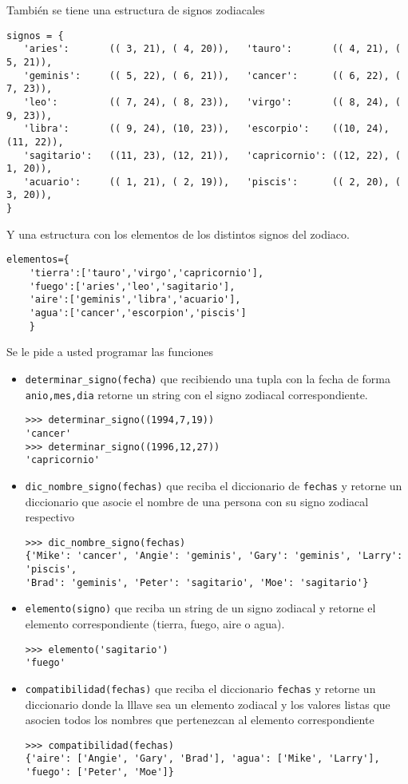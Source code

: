 También se tiene una estructura de signos zodiacales

\begin{lstlisting}[style=consola]
signos = {
   'aries':       (( 3, 21), ( 4, 20)),   'tauro':       (( 4, 21), ( 5, 21)),
   'geminis':     (( 5, 22), ( 6, 21)),   'cancer':      (( 6, 22), ( 7, 23)),
   'leo':         (( 7, 24), ( 8, 23)),   'virgo':       (( 8, 24), ( 9, 23)),
   'libra':       (( 9, 24), (10, 23)),   'escorpio':    ((10, 24), (11, 22)),
   'sagitario':   ((11, 23), (12, 21)),   'capricornio': ((12, 22), ( 1, 20)),
   'acuario':     (( 1, 21), ( 2, 19)),   'piscis':      (( 2, 20), ( 3, 20)),
}
\end{lstlisting}
Y una estructura con los elementos de los distintos signos del zodiaco.
\begin{lstlisting}[style=consola]
elementos={
    'tierra':['tauro','virgo','capricornio'],
    'fuego':['aries','leo','sagitario'],
    'aire':['geminis','libra','acuario'],
    'agua':['cancer','escorpion','piscis']
    }
\end{lstlisting}
Se le pide a usted programar las funciones
\begin{itemize}
    \item \texttt{determinar\_signo(fecha)} que recibiendo una tupla con la fecha de forma \texttt{anio,mes,dia} retorne un string con el signo zodiacal correspondiente.
\begin{lstlisting}[style=consola]
>>> determinar_signo((1994,7,19))
'cancer'
>>> determinar_signo((1996,12,27))
'capricornio'
\end{lstlisting}
    \item \texttt{dic\_nombre\_signo(fechas)} que reciba el diccionario de \texttt{fechas} y retorne un diccionario que asocie el nombre de una persona con su signo zodiacal respectivo
\begin{lstlisting}[style=consola]
>>> dic_nombre_signo(fechas)
{'Mike': 'cancer', 'Angie': 'geminis', 'Gary': 'geminis', 'Larry': 'piscis', 
'Brad': 'geminis', 'Peter': 'sagitario', 'Moe': 'sagitario'}
\end{lstlisting}
    \item \texttt{elemento(signo)} que reciba un string de un signo zodiacal y retorne el elemento correspondiente (tierra, fuego, aire o agua).
\begin{lstlisting}[style=consola]
>>> elemento('sagitario')
'fuego'
\end{lstlisting}
\item \texttt{compatibilidad(fechas)} que reciba el diccionario \texttt{fechas} y retorne un diccionario donde la lllave sea un elemento zodiacal y los valores listas que asocien todos los nombres que pertenezcan al elemento correspondiente
\begin{lstlisting}[style=consola]
>>> compatibilidad(fechas)
{'aire': ['Angie', 'Gary', 'Brad'], 'agua': ['Mike', 'Larry'],
'fuego': ['Peter', 'Moe']}
\end{lstlisting}
\end{itemize}